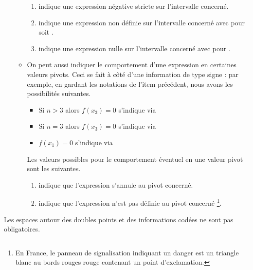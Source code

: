 \documentclass[10pt, a4paper]{article}
\begin{document}
\begin{enumerate}
\begin{itemize}
\begin{enumerate}
			\item \tdocinlatex{-} indique une expression négative stricte sur l'intervalle concerné.
			
			\item {} indique une expression non définie sur l'intervalle concerné avec  pour  soit 
.
	
			\item {} indique une expression nulle sur l'intervalle concerné avec  pour .
		\end{enumerate}

        
        \item On peut aussi indiquer le comportement d'une expression en certaines valeurs pivots. Ceci se fait à côté d'une information de type signe : par exemple, en gardant les notations de l'item précédent, nous avons les possibilités suivantes.
        \begin{itemize}
        	\item Si $n > 3$ alors $f(x_3) = 0$ s'indique via 
	
        	\item Si $n = 3$ alors $f(x_3) = 0$ s'indique via 
	
        	\item $f(x_1) = 0$ s'indique via 	
        \end{itemize}
        Les valeurs possibles pour le comportement éventuel en une valeur pivot sont les suivantes.
		\begin{enumerate}
			\item {} indique que 
l'expression s'annule au pivot concerné.
			
			\item \tdocinlatex{!} indique que 
l'expression n'est pas définie au pivot concerné
        	\footnote{
        		En France, le panneau de signalisation indiquant un danger est un triangle blanc au bords rouges rouge contenant un point d'exclamation.
			}.
		\end{enumerate}
    \end{itemize}
\end{enumerate}




\begin{tdocnote}
    Les espaces autour des doubles points et des informations codées ne sont pas obligatoires.
\end{tdocnote}
\end{document}
